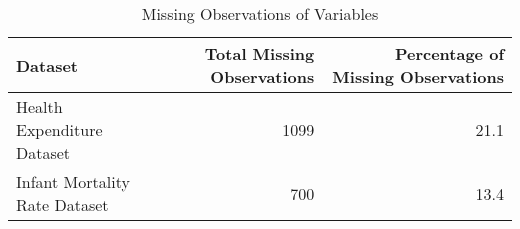 \setcounter{table}{0}
\begin{table}[H]
\caption{Missing Observations of Variables}
\label{Table 1:missings}
\begin{tabular}{lrr}
\toprule
Dataset & Total Missing Observations & Percentage of Missing Observations \\
\midrule
Health Expenditure Dataset & 1099 & 21.1 \\
Infant Mortality Rate Dataset & 700 & 13.4 \\
\bottomrule
\end{tabular}
\end{table}
